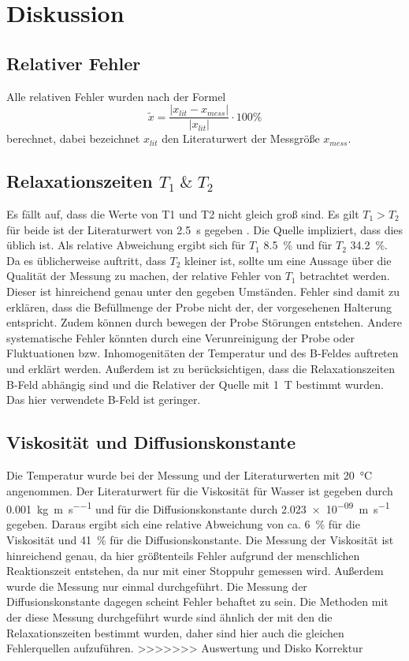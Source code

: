 \section{Diskussion}
\label{sec:Diskussion}
\subsection{Relativer Fehler}
Alle relativen Fehler wurden nach der Formel
\begin{equation*}
  \tilde{x} = \frac{ \lvert x_{lit} - x_{mess} \rvert}{\lvert x_{lit} \rvert}
  \cdot 100 \%
\end{equation*}
berechnet, dabei bezeichnet $x_{lit}$ den Literaturwert der Messgröße $x_{mess}$.
\subsection{Relaxationszeiten \texorpdfstring{$T_1 \; \& \; T_2$}{math}}
Es fällt auf, dass die Werte von T1 und T2 nicht gleich groß sind. Es gilt $T_1 > T_2$ für beide 
ist der Literaturwert von \SI{2,5}{\second} gegeben \cite{hyper}. 
Die Quelle impliziert, dass dies üblich ist. Als 
relative Abweichung ergibt sich für $T_1$ \SI{8,5}{\percent} und für $T_2$ \SI{34,2}{\percent}. Da es üblicherweise auftritt, 
dass $T_2$ kleiner ist, sollte um eine Aussage über die Qualität der Messung zu machen, der relative Fehler von $T_1$ 
betrachtet werden. Dieser ist hinreichend genau unter den gegeben Umständen. Fehler sind damit zu erklären, dass die 
Befüllmenge der Probe nicht der, der vorgesehenen Halterung entspricht. Zudem können durch bewegen der Probe Störungen 
entstehen. Andere systematische Fehler könnten durch eine Verunreinigung der Probe oder Fluktuationen bzw. 
Inhomogenitäten der Temperatur und des B-Feldes auftreten und erklärt werden. Außerdem ist zu berücksichtigen, 
dass die Relaxationszeiten B-Feld abhängig sind und die Relativer der Quelle mit \SI{1}{\tesla} bestimmt wurden. 
Das hier verwendete B-Feld ist geringer. 
\subsection{Viskosität und Diffusionskonstante}
Die Temperatur wurde bei der Messung und der Literaturwerten mit \SI{20}{\celsius} angenommen. 
Der Literaturwert für die Viskosität für Wasser ist gegeben durch \SI{0.001}{\kilo\gram\per\meter\per\second} 
\cite{spekvis} und für die Diffusionskonstante durch \SI{2.023e-09}{\meter\per\second} \cite{Diff} gegeben. 
Daraus ergibt sich eine relative Abweichung von ca. \SI{6}{\percent} für die Viskosität und 
\SI{41}{\percent} für die Diffusionskonstante. Die Messung der Viskosität ist hinreichend genau, da hier 
größtenteils Fehler aufgrund der menschlichen Reaktionszeit entstehen, da nur mit einer Stoppuhr gemessen wird. 
Außerdem wurde die Messung nur einmal durchgeführt. Die Messung der Diffusionskonstante dagegen scheint Fehler 
behaftet zu sein. Die Methoden mit der diese Messung durchgeführt wurde sind ähnlich der mit den die 
Relaxationszeiten bestimmt wurden, daher sind hier auch die gleichen Fehlerquellen aufzuführen.
>>>>>>> Auswertung und Disko Korrektur
